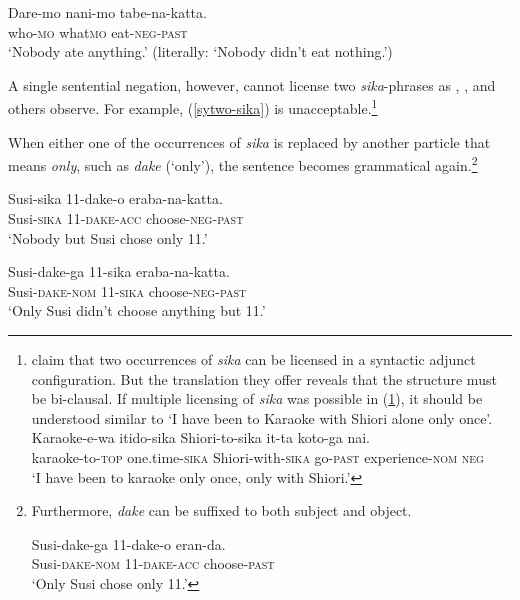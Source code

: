 \documentclass[output=paper]{langscibook}
\begin{document}
\ea \label{syex:negconc}
 \gll Dare-mo nani-mo tabe-na-katta.\\
who-\textsc{mo} what\textsc{mo} eat-\textsc{neg}-\textsc{past}\\
\glt `Nobody ate anything.' (literally: `Nobody didn't eat nothing.')\z

A single sentential negation, however, cannot license two \emph{sika}-phrases as \citet{aoyagi94}, \citet{kawahara08a}, \citet{miyagawa16a} and others observe.  
For example, (\ref{sytwo-sika}) is unacceptable.\footnote{\citet[(28b)]{miyagawa16a} claim that two occurrences of \emph{sika} can be licensed in a syntactic adjunct configuration.  But the translation they offer reveals that the structure must be bi-clausal.  If multiple licensing of \emph{sika} was possible in (\ref{syex:miyag}), it should be understood similar to `I have been to Karaoke with Shiori alone only once'.
\ea \label{syex:miyag}
\gll Karaoke-e-wa itido-sika Shiori-to-sika it-ta koto-ga nai.\\ karaoke-to-\textsc{top} one.time-\textsc{sika} Shiori-with-\textsc{sika} go-\textsc{past} experience-\textsc{nom} \textsc{neg}\\
\glt ‘I have been to karaoke only once, only with Shiori.’ 
\z
}

\z

When either one of the occurrences of \emph{sika} is replaced by another particle that means \emph{only}, such as \emph{dake} (`only'), the sentence becomes grammatical again.\footnote{Furthermore, \emph{dake} can be suffixed to both subject and object.

\ea \gll Susi-dake-ga 11-dake-o eran-da.\\
Susi-\textsc{dake}-\textsc{nom} 11-\textsc{dake}-\textsc{acc} choose-\textsc{past}\\
\glt `Only Susi chose only 11.'\z}

\ea \gll Susi-sika 11-dake-o eraba-na-katta.\\
Susi-\textsc{sika} 11-\textsc{dake}-\textsc{acc} choose-\textsc{neg}-\textsc{past}\\
\glt `Nobody but Susi chose only 11.'\

\ex \gll Susi-dake-ga 11-sika eraba-na-katta.\\
Susi-\textsc{dake}-\textsc{nom} 11-\textsc{sika} choose-\textsc{neg}-\textsc{past}\\
\glt `Only Susi didn't choose anything but 11.'\z
\end{document}
